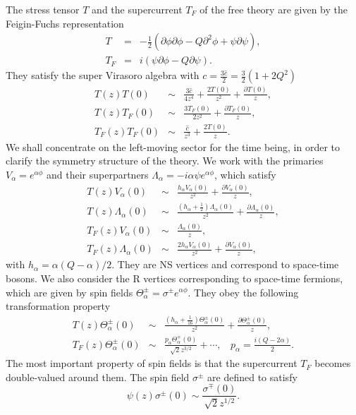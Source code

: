\documentclass[a4paper,12pt]{article}
\newcommand{\tfrac}[2]{{\textstyle\frac{#1}{#2}}}
\newcommand{\mfrac}[2]{{\displaystyle\frac{#1}{#2}}}
\newcommand{\ch}{{\hat{c}}}
\begin{document}
   The stress tensor $T$ and the supercurrent $T_F$ of the free
 theory are given by the Feigin-Fuchs representation
\begin{equation}
\begin{array}{rcl}
  T   &=& -\frac{1}{2}(\partial\phi\partial\phi
                  -Q\partial^2\phi+\psi\partial\psi),\\
  T_F &=& i(\psi\partial\phi - Q\partial\psi).
\end{array}
\end{equation}
 They satisfy the super Virasoro algebra with
 $c=\tfrac{3\ch}{2}=\tfrac{3}{2}(1+2Q^2)$
\begin{eqnarray}
  T(z)  T(0)  &\sim&
  \frac{3\ch}{4z^4}+\frac{2T(0)}{z^2}+\frac{\partial T(0)}{z}, \nonumber \\
  T(z)  T_F(0)&\sim&\frac{3T_F(0)}{2z^2}+\frac{\partial T_F(0)}{z},\\
  T_F(z)T_F(0)&\sim&\frac{\ch}{z^3}+\frac{2T(0)}{z}. \nonumber
\end{eqnarray}
 We shall concentrate on the left-moving sector for the time being,
 in order to clarify the symmetry structure of the theory. 
 We work with the primaries $V_\alpha=e^{\alpha\phi}$
 and their superpartners $\Lambda_\alpha=-i\alpha\psi e^{\alpha\phi}$,
 which satisfy
\begin{equation}
\begin{array}{rcl}
  T(z)V_\alpha(0)&\sim&
   \mfrac{h_\alpha V_\alpha(0)}{z^2}
  +\mfrac{\partial V_\alpha(0)}{z}, \\
  T(z)\Lambda_\alpha(0)&\sim&
   \mfrac{(h_\alpha+\frac{1}{2}) \Lambda_\alpha(0)}{z^2}
  +\mfrac{\partial \Lambda_\alpha(0)}{z}, \\
  T_F(z)V_\alpha(0)&\sim&
   \mfrac{\Lambda_\alpha(0)}{z}, \\
  T_F(z)\Lambda_\alpha(0)&\sim&
   \mfrac{2h_\alpha V_\alpha(0)}{z^2}
  +\mfrac{\partial V_\alpha(0)}{z},
\end{array}
\end{equation}
 with $h_\alpha=\alpha(Q-\alpha)/2$.
 They are NS vertices and correspond to space-time bosons.
 We also consider the R vertices corresponding to space-time
 fermions, which are given by spin fields
 $\Theta_\alpha^\pm=\sigma^\pm e^{\alpha\phi}$.
 They obey the following transformation property
\begin{equation}
\begin{array}{rcl}
  T(z)\Theta_\alpha^\pm(0) &\sim&
  \mfrac{(h_\alpha+\frac{1}{16})\Theta_\alpha^\pm(0)}{z^2}
 +\mfrac{\partial\Theta_\alpha^\pm(0)}{z} , \\
  T_F(z)\Theta_\alpha^\pm(0) &\sim&
  \mfrac{p_\alpha\Theta_\alpha^\mp(0)}{\sqrt{2}z^{3/2}}+\cdots,~~~~
  p_\alpha =\mfrac{i(Q-2\alpha)}{2}.
\end{array}
\end{equation}
 The most important property of spin fields is that the
 supercurrent $T_F$ becomes double-valued around them.
 The spin field $\sigma^\pm$ are defined to satisfy
\begin{equation}
  \psi(z)\sigma^\pm(0)\sim \frac{\sigma^\mp(0)}{\sqrt{2}z^{1/2}}.
\label{pxs}
\end{equation}
\end{document}

